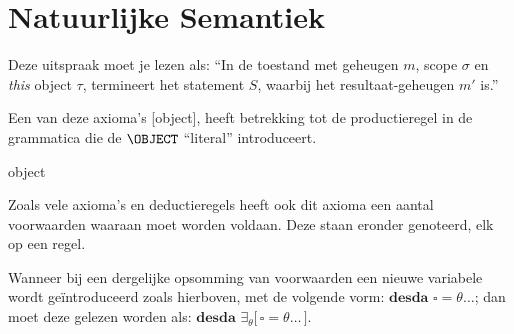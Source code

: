 
\chapter{Natuurlijke Semantiek}







Deze uitspraak moet je lezen als: ``In de toestand met geheugen $m$, scope $\sigma$ en \emph{this} object $\tau$, termineert het statement $S$, waarbij het resultaat-geheugen $m'$ is.''

Een van deze axioma's [object], heeft betrekking tot de productieregel in de grammatica die de $\OBJECT$ ``literal'' introduceert.

\begin{NSAxiom}{object}
  \begin{prooftree}
  \end{prooftree}
  \begin{NSConditions}
  \end{NSConditions}
\end{NSAxiom}

Zoals vele axioma's en deductieregels heeft ook dit axioma een aantal voorwaarden waaraan moet worden voldaan. Deze staan eronder genoteerd, elk op een regel.

Wanneer bij een dergelijke opsomming van voorwaarden een nieuwe variabele wordt geïntroduceerd zoals hierboven, met de volgende vorm: $\textbf{desda } \square = \theta \dots$; dan moet deze gelezen worden als: $\textbf{desda } \exists_\theta \big[\, \square = \theta \dots \,\big]$.

